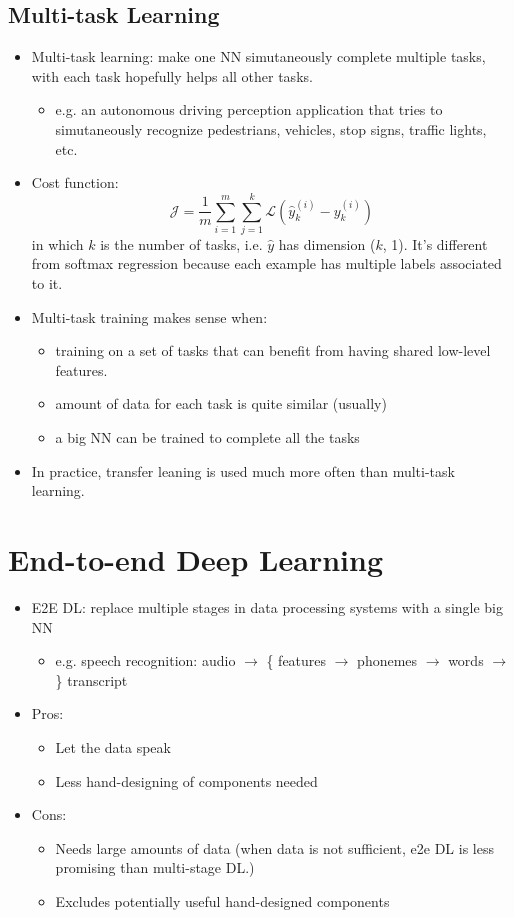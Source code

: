 \subsection{Multi-task Learning}
\begin{itemize}
  \item Multi-task learning: make one NN simutaneously complete multiple tasks, with each task hopefully helps all other tasks. 
  \begin{itemize}
    \item e.g. an autonomous driving perception application that tries to simutaneously recognize pedestrians, vehicles, stop signs, traffic lights, etc.
  \end{itemize}
  \item Cost function:
  \[\mathcal{J}=\frac{1}{m}\displaystyle\sum_{i=1}^m\displaystyle\sum_{j=1}^k\mathcal{L}\left(\hat{y}^{(i)}_k-y^{(i)}_k\right)\]
  in which $k$ is the number of tasks, i.e. $\hat{y}$ has dimension ($k$, 1). It's different from softmax regression because each example has multiple labels associated to it.
  \item Multi-task training makes sense when:
  \begin{itemize}
    \item training on a set of tasks that can benefit from having shared low-level features.
    \item amount of data for each task is quite similar (usually)
    \item a big NN can be trained to complete all the tasks
  \end{itemize}
  \item In practice, transfer leaning is used much more often than multi-task learning.
\end{itemize}
\section{End-to-end Deep Learning}
\begin{itemize}
  \item E2E DL: replace multiple stages in data processing systems with a single big NN
  \begin{itemize}
    \item e.g. speech recognition: audio $\rightarrow$ \{ features $\rightarrow$ phonemes $\rightarrow$ words $\rightarrow$ \} transcript
  \end{itemize}
  \item Pros:
  \begin{itemize}
    \item Let the data speak
    \item Less hand-designing of components needed
  \end{itemize}
  \item Cons:
  \begin{itemize}
    \item Needs large amounts of data (when data is not sufficient, e2e DL is less promising than multi-stage DL.)
    \item Excludes potentially useful hand-designed components
  \end{itemize}
\end{itemize}
\ifx\PREAMBLE\undefined

\fi